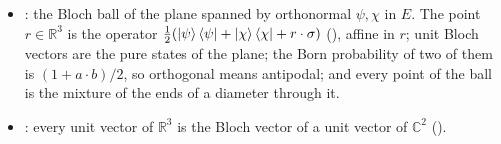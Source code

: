 \documentclass[11pt]{article}
\begin{document}
\begin{itemize}
\begin{itemize}
  (); every density operator is such a mixture, of countably many
  orthonormal pure states, its eigenvectors with nonzero eigenvalue
  (); in infinite dimension some density operator
  has entropy $\infty$ ().
\item {}: the Bloch ball of the plane spanned by
  orthonormal $\psi, \chi$ in $E$. The point $r \in \mathbb R^3$ is the operator
  $\tfrac12(\ket\psi\bra\psi + \ket\chi\bra\chi + r\cdot\sigma)$
  (), affine in $r$; unit Bloch vectors are the pure states of the plane; the
  Born probability of two of them is $(1 + a\cdot b)/2$, so orthogonal means antipodal; and every
  point of the ball is the mixture of the ends of a diameter through it.
\item {}: every unit vector of $\mathbb R^3$ is
  the Bloch vector of a unit vector of $\mathbb C^2$ ().
\end{itemize}
\end{itemize}
\end{document}
